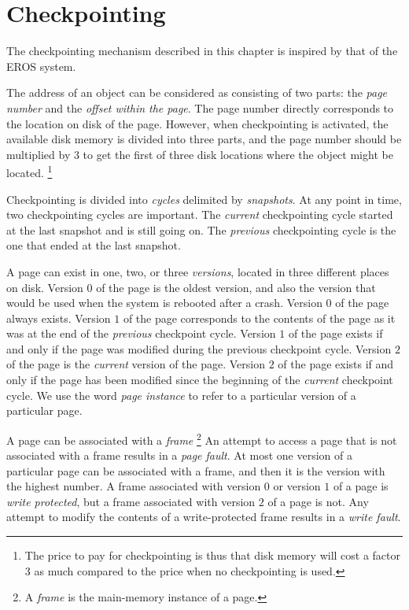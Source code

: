 \chapter{Checkpointing}
\label{chap-checkpointing}

The checkpointing mechanism described in this chapter is inspired by
that of the EROS system.

The address of an object can be considered as consisting of two parts:
the \emph{page number} and the \emph{offset within the page}.  The
page number directly corresponds to the location on disk of the page.
However, when checkpointing is activated, the available disk memory is
divided into three parts, and the page number should be multiplied by
3 to get the first of three disk locations where the object might be
located.%
\footnote{The price to pay for checkpointing is thus that disk memory
  will cost a factor 3 as much compared to the price when no
  checkpointing is used.}

Checkpointing is divided into \emph{cycles} delimited by
\emph{snapshots}.  At any point in time, two checkpointing cycles are
important.  The \emph{current} checkpointing cycle started at the
last snapshot and is still going on.  The \emph{previous}
checkpointing cycle is the one that ended at the last snapshot. 

A page can exist in one, two, or three \emph{versions}, located in
three different places on disk.  Version $0$ of the page is the oldest
version, and also the version that would be used when the system is
rebooted after a crash.  Version $0$ of the page always exists.
Version $1$ of the page corresponds to the contents of the page as it
was at the end of the \emph{previous} checkpoint cycle.  Version $1$
of the page exists if and only if the page was modified during the
previous checkpoint cycle.  Version $2$ of the page is the
\emph{current} version of the page.  Version $2$ of the page exists if
and only if the page has been modified since the beginning of the
\emph{current} checkpoint cycle.  We use the word \emph{page instance}
to refer to a particular version of a particular page. 

A page can be associated with a \emph{frame}%
\footnote{A \emph{frame} is the main-memory instance of a page.}  An
attempt to access a page that is not associated with a frame results
in a \emph{page fault}.  At most one version of a particular page can
be associated with a frame, and then it is the version with the
highest number.  A frame associated with version $0$ or version $1$ of
a page is \emph{write protected}, but a frame associated with version
$2$ of a page is not.  Any attempt to modify the contents of a
write-protected frame results in a \emph{write fault}.

